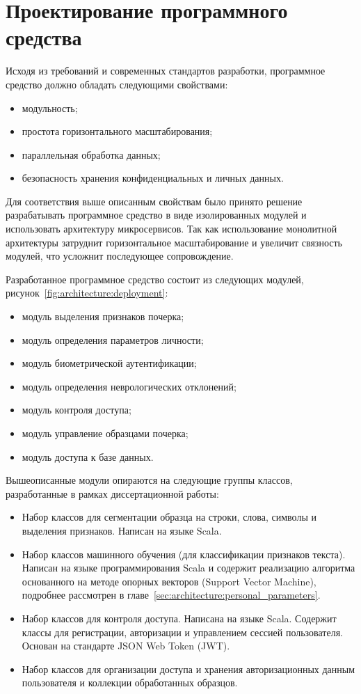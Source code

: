 \section{Проектирование программного средства}

Исходя из требований и современных стандартов разработки, программное средство должно обладать следующими свойствами:
\begin{itemize}
    \item модульность;
    \item простота горизонтального масштабирования;
    \item параллельная обработка данных;
    \item безопасность хранения конфиденциальных и личных данных.
\end{itemize}

Для соответствия выше описанным свойствам было принято решение разрабатывать программное средство в виде изолированных модулей и использовать архитектуру микросервисов. Так как использование монолитной архитектуры затруднит горизонтальное масштабирование и увеличит связность модулей, что усложнит последующее сопровождение. 

Разработанное программное средство состоит из следующих модулей, рисунок~\ref{fig:architecture:deployment}:
\begin{itemize}
    \item модуль выделения признаков почерка;
    \item модуль определения параметров личности;
    \item модуль биометрической аутентификации;
    \item модуль определения неврологических отклонений;
    \item модуль контроля доступа;
    \item модуль управление образцами почерка;
    \item модуль доступа к базе данных.
\end{itemize}

Вышеописанные модули опираются на следующие группы классов, разработанные в рамках диссертационной работы:
\begin{itemize}
    \item Набор классов для сегментации образца на строки, слова, символы и выделения признаков. Написан на языке Scala.
    \item Набор классов машинного обучения (для классификации признаков текста). Написан на языке программирования Scala и содержит реализацию алгоритма основанного на методе опорных векторов (Support Vector Machine), подробнее рассмотрен в главе~\ref{sec:architecture:personal_parameters}.
    \item Набор классов для контроля доступа. Написана на языке Scala. Содержит классы для регистрации, авторизации и управлением сессией пользователя. Основан на стандарте JSON Web Token (JWT).
    \item Набор классов для организации доступа и хранения авторизационных данным пользователя и коллекции обработанных образцов.
\end{itemize}

